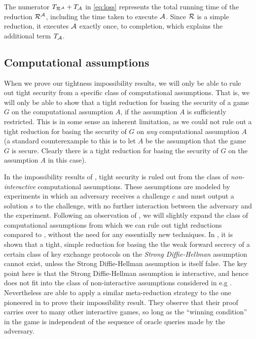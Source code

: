 \begin{remark}
  The numerator \(T_{\redR^{\advA}} + T_{\advA}\) in \eqref{eq:loss}
  represents the total running time of the reduction \(\redR^{\advA}\),
  including the time taken to execute \(\mathcal{A}\).
  Since \(\redR\) is a simple reduction,
  it executes \(\mathcal{A}\) exactly once, to completion,
  which explains the additional term \(T_{\mathcal{A}}\).
\end{remark}

\subsection{Computational assumptions}

When we prove our tightness impossibility results,
we will only be able to rule out tight security
from a specific class of computational assumptions.
That is, we will only be able to show that
a tight reduction for basing the security of a game \(G\)
on the computational assumption \(A\),
if the assumption \(A\) is sufficiently restricted.
This is in some sense an inherent limitation,
as we could not rule out a tight reduction
for basing the security of \(G\)
on \emph{any} computational assumption \(A\)
(a standard counterexample to this is to let \(A\) be the assumption that the game \(G\) is secure.
Clearly there is a tight reduction
for basing the security of \(G\) on the assumption \(A\) in this case).

In the impossibility results of ,
tight security is ruled out from the class of \emph{non-interactive}
computational assumptions.
These assumptions are modeled by experiments in which an adversary receives a challenge \(c\)
and must output a solution \(s\) to the challenge, with no further interaction between the adversary and the experiment.
Following an observation of , we will slightly expand the class of computational assumptions
from which we can rule out tight reductions
compared to , without the need for any essentially new techniques.
In , it is shown that a tight, simple reduction
for basing the the weak forward secrecy of a certain class of key exchange protocols
on the \emph{Strong Diffie-Hellman} assumption
cannot exist, unless the Strong Diffie-Hellman assumption is itself false.
The key point here is that the Strong Diffie-Hellman assumption is interactive,
and hence does not fit into the class of non-interactive assumptions considered in e.g .
Nevertheless  are able to apply a similar meta-reduction strategy
to the one pioneered in  to prove their impossibility result.
They observe that their proof carries over to many other
interactive games, so long as the ``winning condition''
in the game is independent of the sequence of oracle queries made by the adversary.

